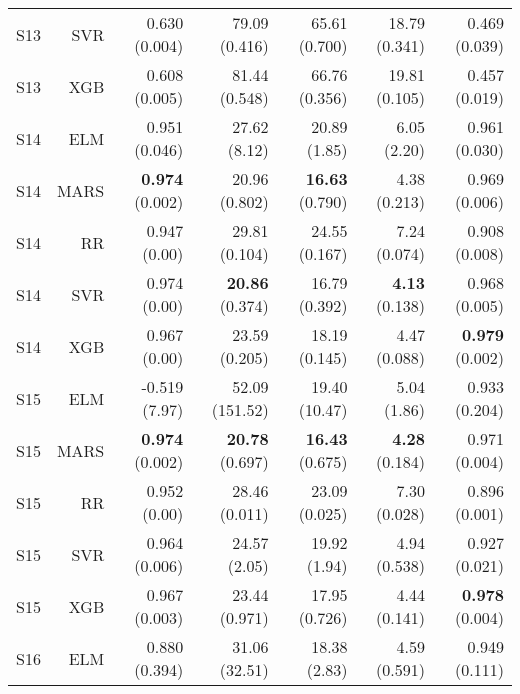 \begin{table}
\begin{tabular}{rrrrrrr}
    S13 &       SVR &                       0.630 (0.004) &             79.09 (0.416) &           65.61 (0.700) &           18.79 (0.341) &         0.469 (0.039) \\
    S13 &       XGB &                       0.608 (0.005) &             81.44 (0.548) &           66.76 (0.356) &           19.81 (0.105) &         0.457 (0.019) \\
    S14 &       ELM &                       0.951 (0.046) &              27.62 (8.12) &            20.89 (1.85) &             6.05 (2.20) &         0.961 (0.030) \\
    S14 &      MARS &                { \bf 0.974} (0.002) &             20.96 (0.802) &    { \bf 16.63} (0.790) &            4.38 (0.213) &         0.969 (0.006) \\
    S14 &        RR &                        0.947 (0.00) &             29.81 (0.104) &           24.55 (0.167) &            7.24 (0.074) &         0.908 (0.008) \\
    S14 &       SVR &                        0.974 (0.00) &      { \bf 20.86} (0.374) &           16.79 (0.392) &     { \bf 4.13} (0.138) &         0.968 (0.005) \\
    S14 &       XGB &                        0.967 (0.00) &             23.59 (0.205) &           18.19 (0.145) &            4.47 (0.088) &  { \bf 0.979} (0.002) \\
    S15 &       ELM &                       -0.519 (7.97) &            52.09 (151.52) &           19.40 (10.47) &             5.04 (1.86) &         0.933 (0.204) \\
    S15 &      MARS &                { \bf 0.974} (0.002) &      { \bf 20.78} (0.697) &    { \bf 16.43} (0.675) &     { \bf 4.28} (0.184) &         0.971 (0.004) \\
    S15 &        RR &                        0.952 (0.00) &             28.46 (0.011) &           23.09 (0.025) &            7.30 (0.028) &         0.896 (0.001) \\
    S15 &       SVR &                       0.964 (0.006) &              24.57 (2.05) &            19.92 (1.94) &            4.94 (0.538) &         0.927 (0.021) \\
    S15 &       XGB &                       0.967 (0.003) &             23.44 (0.971) &           17.95 (0.726) &            4.44 (0.141) &  { \bf 0.978} (0.004) \\
    S16 &       ELM &                       0.880 (0.394) &             31.06 (32.51) &            18.38 (2.83) &            4.59 (0.591) &         0.949 (0.111) \\

\end{tabular}
\end{table}
